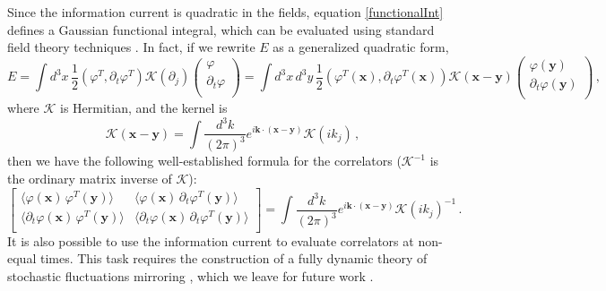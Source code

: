 \documentclass[a4paper, amsfonts, amssymb, amsmath, reprint, showkeys, nofootinbib, twoside,notitlepage,onecolumn,preprintnumbers]{revtex4-2}
\theoremstyle{definition}
\theoremstyle{theorem}
\theoremstyle{corollary}
\begin{document}
Since the information current is quadratic in the fields, equation \eqref{functionalInt} defines a Gaussian functional integral, which can be evaluated using standard field theory techniques \cite{weinbergQFT_1995}. In fact, if we rewrite $E$ as a generalized quadratic form,
\begin{equation}\label{mazurca}
    E= \int d^3x \,  \dfrac{1}{2} (\varphi^T, \partial_t \varphi^T)
\mathcal{K}(\partial_j) \!
\begin{pmatrix}
\varphi \\
\partial_t \varphi \\
\end{pmatrix} 
=
\int d^3x \, d^3 y \, \dfrac{1}{2} (\varphi^T(\textbf{x}), \partial_t \varphi^T(\textbf{x}))
\mathcal{K}(\textbf{x}-\textbf{y}) \!
\begin{pmatrix}
\varphi(\textbf{y}) \\
\partial_t \varphi(\textbf{y}) \\
\end{pmatrix} \, , 
\end{equation}
where $\mathcal{K}$ is Hermitian, and the kernel is
\begin{equation}
    \mathcal{K}(\textbf{x}-\textbf{y}) = \int \dfrac{d^3 k}{(2\pi)^3} e^{i\textbf{k}\cdot (\textbf{x}-\textbf{y})} \mathcal{K}(ik_j) \, ,
\end{equation}
then we have the following well-established formula for the correlators \cite{weinbergQFT_1995} ($\mathcal{K}^{-1}$ is the ordinary matrix inverse of $\mathcal{K}$):
\begin{equation}\label{feynman}
\begin{bmatrix}
  \langle \varphi(\textbf{x}) \, \varphi^T(\textbf{y}) \rangle   &  \langle \varphi(\textbf{x}) \, \partial_t \varphi^T(\textbf{y}) \rangle\\
   \langle \partial_t \varphi(\textbf{x}) \, \varphi^T(\textbf{y}) \rangle  & \langle \partial_t  \varphi(\textbf{x}) \, \partial_t \varphi^T(\textbf{y}) \rangle \\
\end{bmatrix}
     = \int \dfrac{d^3 k}{(2\pi)^3} e^{i\textbf{k}\cdot (\textbf{x}-\textbf{y})} \mathcal{K}(ik_j)^{-1} \, .
\end{equation}
It is also possible to use the information current to evaluate correlators at non-equal times. This task requires the construction of a fully dynamic theory of stochastic fluctuations mirroring \cite{Mullins:2023tjg}, which we leave for future work \cite{GavassinoFluctatingBDNK2024vyu}.
\end{document}
